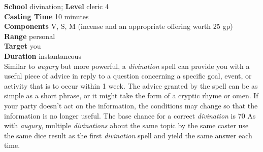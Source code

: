 \textbf{School} divination; \textbf{Level} cleric 4\\
\textbf{Casting Time} 10 minutes\\
\textbf{Components} V, S, M (incense and an appropriate offering worth 25 gp)\\
\textbf{Range} personal\\
\textbf{Target} you\\
\textbf{Duration} instantaneous \\
Similar to \textit{augury }but more powerful, a \textit{divination }spell can provide you with a useful piece of advice in reply to a question concerning a specific goal, event, or activity that is to occur within 1 week. The advice granted by the spell can be as simple as a short phrase, or it might take the form of a cryptic rhyme or omen. If your party doesn't act on the information, the conditions may change so that the information is no longer useful. The base chance for a correct \textit{divination }is 70%
As with \textit{augury}, multiple \textit{divinations }about the same topic by the same caster use the same dice result as the first \textit{divination }spell and yield the same answer each time.\\
